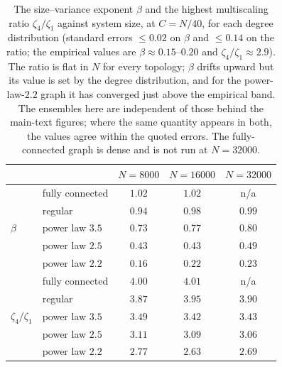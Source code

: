 \begin{table}[htbp]
    \centering
    \begin{tabular}{llccc}
        \hline
        & & $N=8000$ & $N=16000$ & $N=32000$ \\
        \hline
        \multirow{5}{*}{$\beta$}
          & fully connected & $1.02$ & $1.02$ & n/a \\
          & regular         & $0.94$ & $0.98$ & $0.99$ \\
          & power law $3.5$ & $0.73$ & $0.77$ & $0.80$ \\
          & power law $2.5$ & $0.43$ & $0.43$ & $0.49$ \\
          & power law $2.2$ & $0.16$ & $0.22$ & $0.23$ \\
        \hline
        \multirow{5}{*}{$\zeta_4/\zeta_1$}
          & fully connected & $4.00$ & $4.01$ & n/a \\
          & regular         & $3.87$ & $3.95$ & $3.90$ \\
          & power law $3.5$ & $3.49$ & $3.42$ & $3.43$ \\
          & power law $2.5$ & $3.11$ & $3.09$ & $3.06$ \\
          & power law $2.2$ & $2.77$ & $2.63$ & $2.69$ \\
        \hline
    \end{tabular}
    \caption{The size--variance exponent $\beta$ and the highest multiscaling ratio
    $\zeta_4/\zeta_1$ against system size, at $C = N/40$, for each degree distribution
    (standard errors $\le 0.02$ on $\beta$ and $\le 0.14$ on the ratio; the empirical values are
    $\beta \approx 0.15$--$0.20$ and $\zeta_4/\zeta_1 \approx 2.9$). The ratio is flat in $N$ for
    every topology; $\beta$ drifts upward but its value is set by the degree distribution, and
    for the power-law-$2.2$ graph it has converged just above the empirical band. The
    ensembles here are independent of those behind the main-text figures; where the same
    quantity appears in both, the values agree within the quoted errors. The
    fully-connected graph is dense and is not run at $N = 32000$.}
    \label{tab:scaling}
\end{table}
